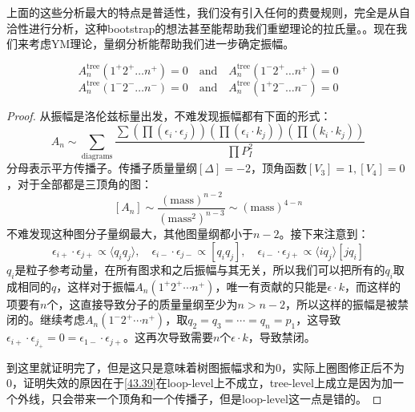 上面的这些分析最大的特点是普适性，我们没有引入任何的费曼规则，完全是从自洽性进行分析，这种bootstrap的想法甚至能帮助我们重塑理论的拉氏量。。现在我们来考虑YM理论，量纲分析能帮助我们进一步确定振幅。
\begin{theorem}
	\begin{equation}
		A^\text{tree}_n(1^+2^+\ldots n^+)=0\quad\mathrm{and}\quad A^\text{tree}_n(1^-2^+\ldots n^+)=0
	\end{equation}
	\begin{equation}
		A^\text{tree}_n(1^-2^-\ldots n^-)=0\quad\mathrm{and}\quad A^\text{tree}_n(1^+2^-\ldots n^-)=0
	\end{equation}
\end{theorem}
\begin{proof}
	从振幅是洛伦兹标量出发，不难发现振幅都有下面的形式：
	\begin{equation}
		A_n\sim\sum_\text{diagrams}{ \frac { \sum \left ( \prod ( \epsilon _ i \cdot \epsilon _ j ) \right ) \left ( \prod ( \epsilon _ i \cdot k _ j ) \right ) \left ( \prod ( k _ i \cdot k _ j ) \right ) }{ \prod P _ I ^ 2}}
	\end{equation}
	分母表示平方传播子。传播子质量量纲$[\Delta]=-2$，顶角函数$[V_3]=1,[V_4]=0$，对于全部都是三顶角的图：
	\begin{equation}\label{43.39}
		\left[A_n\right]\sim\frac{(\mathrm{mass})^{n-2}}{(\mathrm{mass}^2)^{n-3}}\sim(\mathrm{mass})^{4-n}
	\end{equation}
	不难发现这种图分子量纲最大，其他图量纲都小于$n-2$。接下来注意到：
	\begin{equation}
		\epsilon_{i+}\cdot\epsilon_{j+}\propto\langle q_iq_j\rangle,\quad\epsilon_{i-}\cdot\epsilon_{j-}\propto[q_iq_j],\quad\epsilon_{i-}\cdot\epsilon_{j+}\propto\langle iq_j\rangle[jq_i]
	\end{equation}
	$q_i$是粒子参考动量，在所有图求和之后振幅与其无关，所以我们可以把所有的$q_i$取成相同的$q$，这样对于振幅$A_n(1^+2^+\cdots n^+)$，唯一有贡献的只能是$\epsilon\cdot k$，而这样的项要有$n$个，这直接导致分子的质量量纲至少为$n>n-2$，所以这样的振幅是被禁闭的。继续考虑$A_n(1^-2^+\cdots n^+)$，取$q_2=q_3=\cdots=q_n=p_1$，这导致$\epsilon_{i+}\cdot\epsilon_{j_+}=0=\epsilon_{1-}\cdot\epsilon_{j+}$。这再次导致需要$n$个$\epsilon\cdot k$，导致禁闭。
	
	\setlength{\parindent}{2em}到这里就证明完了，但是这只是意味着树图振幅求和为0，实际上圈图修正后不为0，证明失效的原因在于\ref{43.39}在loop-level上不成立，tree-level上成立是因为加一个外线，只会带来一个顶角和一个传播子，但是loop-level这一点是错的。
\end{proof}
